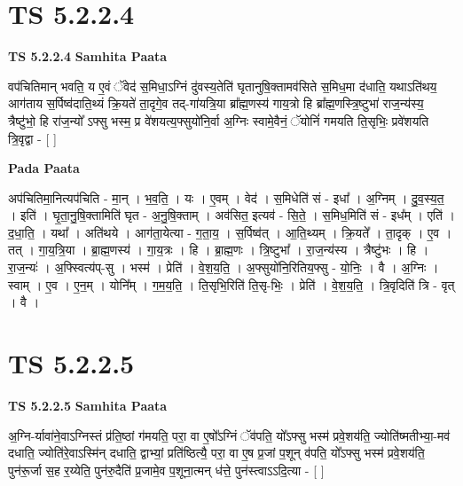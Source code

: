 \documentclass[17pt]{extarticle}
\begin{document}
\section*{ TS 5.2.2.4 }

\textbf{TS 5.2.2.4 } \newline
\textbf{Samhita Paata} \newline

वप॑चितिमान् भवति॒ य ए॒वं ॅवेद॑ स॒मिधा॒ऽग्निं दु॑वस्य॒तेति॑ घृतानुषि॒क्तामव॑सिते स॒मिध॒मा द॑धाति॒ यथाऽति॑थय॒ आग॑ताय स॒र्पिष्व॑दाति॒थ्यं क्रि॒यते॑ ता॒दृगे॒व तद्-गा॑यत्रि॒या ब्रा᳚ह्म॒णस्य॑ गाय॒त्रो हि ब्रा᳚ह्म॒णस्त्रि॒ष्टुभा॑ राज॒न्य॑स्य॒ त्रैष्टु॑भो॒ हि रा॑ज॒न्यो᳚ ऽफ्सु भस्म॒ प्र वे॑शयत्य॒फ्सुयो॑नि॒र्वा अ॒ग्निः स्वामे॒वैनं॒ ॅयोनिं॑ गमयति ति॒सृभिः॒ प्रवे॑शयति त्रि॒वृद्वा - [  ] \newline

\textbf{Pada Paata} \newline

अप॑चितिमा॒नित्यप॑चिति - मा॒न् । भ॒व॒ति॒ । यः । ए॒वम् । वेद॑ । स॒मिधेति॑ सं - इधा᳚ । अ॒ग्निम् । दु॒व॒स्य॒त॒ । इति॑ । घृ॒ता॒नु॒षि॒क्तामिति॑ घृत - अ॒नु॒षि॒क्ताम् । अव॑सित॒ इत्यव॑ - सि॒ते॒ । स॒मिध॒मिति॑ सं - इध᳚म् । एति॑ । द॒धा॒ति॒ । यथा᳚ । अति॑थये । आग॑ता॒येत्या - ग॒ता॒य॒ । स॒र्पिष्व॑त् । आ॒ति॒थ्यम् । क्रि॒यते᳚ । ता॒दृक् । ए॒व । तत् । गा॒य॒त्रि॒या । ब्रा॒ह्म॒णस्य॑ । गा॒य॒त्रः । हि । ब्रा॒ह्म॒णः । त्रि॒ष्टुभा᳚ । रा॒ज॒न्य॑स्य । त्रैष्टु॑भः । हि । रा॒ज॒न्यः॑ । अ॒फ्स्वित्य॑प्-सु । भस्म॑ । प्रेति॑ । वे॒श॒य॒ति॒ । अ॒फ्सुयो॑नि॒रितिय॒फ्सु - यो॒निः॒ । वै । अ॒ग्निः । स्वाम् । ए॒व । ए॒न॒म् । योनि᳚म् । ग॒म॒य॒ति॒ । ति॒सृभि॒रिति॑ ति॒सृ-भिः॒ । प्रेति॑ । वे॒श॒य॒ति॒ । त्रि॒वृदिति॑ त्रि - वृत् । वै ।  \newline




\section*{ TS 5.2.2.5 }

\textbf{TS 5.2.2.5 } \newline
\textbf{Samhita Paata} \newline

अ॒ग्नि-र्यावा॑ने॒वाऽग्निस्तं प्र॑ति॒ष्ठां ग॑मयति॒ परा॒ वा ए॒षो᳚ऽग्निं ॅव॑पति॒ यो᳚ऽफ्सु भस्म॑ प्रवे॒शय॑ति॒ ज्योति॑ष्मतीभ्या॒-मव॑ दधाति॒ ज्योति॑रे॒वाऽस्मि॑न् दधाति॒ द्वाभ्यां॒ प्रति॑ष्ठित्यै॒ परा॒ वा ए॒ष प्र॒जां प॒शून् व॑पति॒ यो᳚ऽफ्सु भस्म॑ प्रवे॒शय॑ति॒ पुन॑रू॒र्जा स॒ह र॒य्येति॒ पुन॑रु॒दैति॑ प्र॒जामे॒व प॒शूना॒त्मन् ध॑त्ते॒ पुन॑स्त्वाऽऽदि॒त्या - [  ] \newline
\end{document}
